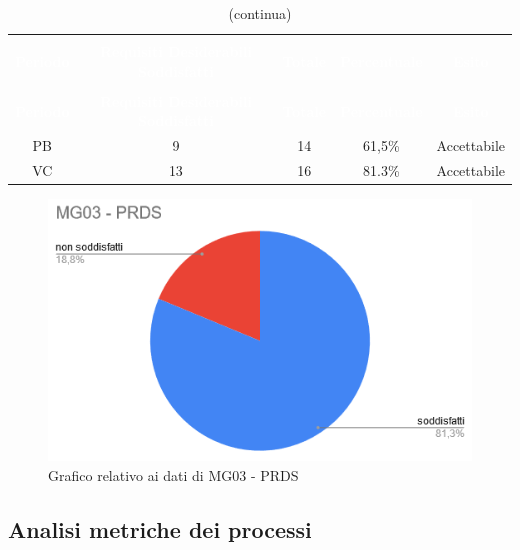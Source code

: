 \begin{longtable}{c c c c c}
\rowcolor{white}\caption{Esiti MG03 - PRDS}\\
		\rowcolor{redafk}
		\textcolor{white}{\textbf{Periodo}} &
\textcolor{white}{\textbf{Requisiti Desiderabili Soddisfatti}} & \textcolor{white}{\textbf{Totale}} & 
\textcolor{white}{\textbf{Percentuale}} & \textcolor{white}{\textbf{Esito}}\\
		\endfirsthead
		\rowcolor{white}\caption[]{(continua)} \\
		\rowcolor{redafk}
		\textcolor{white}{\textbf{Periodo}} &
\textcolor{white}{\textbf{Requisiti Desiderabili Soddisfatti}} & \textcolor{white}{\textbf{Totale}} & 
\textcolor{white}{\textbf{Percentuale}} & \textcolor{white}{\textbf{Esito}}\\
		\endhead
		PB & 9 & 14 & 61,5\% & Accettabile \\
		VC & 13 & 16 & 81.3\% & Accettabile \\
\end{longtable}

\begin{figure}[H]
\centering
\includegraphics[scale=0.7]{./img/MG03.png}
\caption{Grafico relativo ai dati di MG03 - PRDS}
\end{figure}

\subsection{Analisi metriche dei processi}
